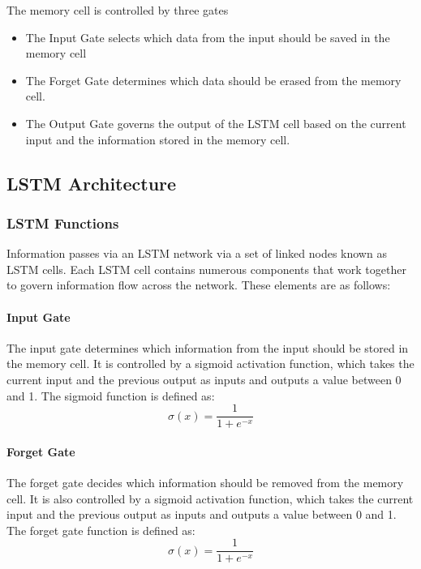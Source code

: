 \documentclass[
]{article}
\providecommand{\tightlist}{%
  \setlength{\itemsep}{0pt}\setlength{\parskip}{0pt}}
\begin{document}
The memory cell is controlled by three gates

\begin{itemize}
\tightlist
\item
  The Input Gate selects which data from the input should be saved in
  the memory cell
\item
  The Forget Gate determines which data should be erased from the memory
  cell.
\item
  The Output Gate governs the output of the LSTM cell based on the
  current input and the information stored in the memory cell.
\end{itemize}

\hypertarget{lstm-architecture}{%
\subsection{LSTM Architecture}\label{lstm-architecture}}

\hypertarget{lstm-functions}{%
\subsubsection{LSTM Functions}\label{lstm-functions}}

Information passes via an LSTM network via a set of linked nodes known
as LSTM cells. Each LSTM cell contains numerous components that work
together to govern information flow across the network. These elements
are as follows:

\hypertarget{input-gate}{%
\paragraph{Input Gate}\label{input-gate}}

The input gate determines which information from the input should be
stored in the memory cell. It is controlled by a sigmoid activation
function, which takes the current input and the previous output as
inputs and outputs a value between 0 and 1. The sigmoid function is
defined as: \[ \sigma(x) = \frac{1}{1 + e^{-x}} \]

\hypertarget{forget-gate}{%
\paragraph{Forget Gate}\label{forget-gate}}

The forget gate decides which information should be removed from the
memory cell. It is also controlled by a sigmoid activation function,
which takes the current input and the previous output as inputs and
outputs a value between 0 and 1. The forget gate function is defined as:
\[ \sigma(x) = \frac{1}{1 + e^{-x}} \]
\end{document}
